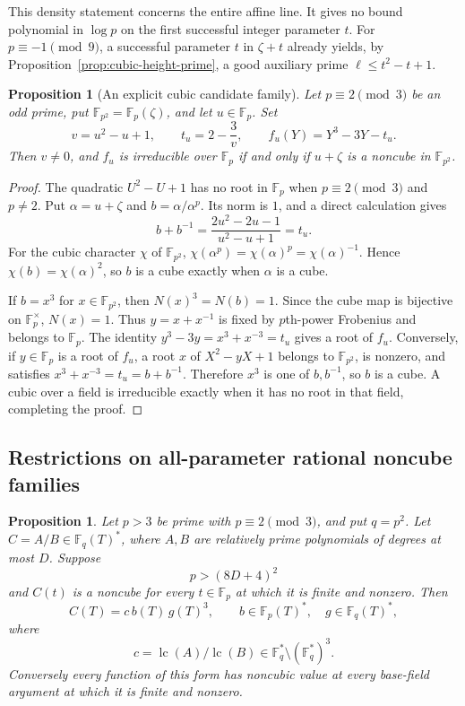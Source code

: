 \documentclass[11pt]{article}
\newtheorem{proposition}[theorem]{Proposition}
\theoremstyle{definition}
\theoremstyle{remark}
\begin{document}
This density statement concerns the entire affine line.
It gives no bound polynomial in $\log p$ on the first successful
integer parameter $t$. For $p\equiv-1\pmod9$, a successful parameter
$t$ in $\zeta+t$ already yields, by
Proposition~\ref{prop:cubic-height-prime}, a good auxiliary prime
$\ell\le t^2-t+1$.

\begin{proposition}[An explicit cubic candidate family]
\label{prop:cubic-torus-family}
Let $p\equiv2\pmod3$ be an odd prime, put
$\mathbb F_{p^2}=\mathbb F_p(\zeta)$, and let $u\in\mathbb F_p$.
Set
\[
 v=u^2-u+1,\qquad
 t_u=2-\frac3v,\qquad
 f_u(Y)=Y^3-3Y-t_u .
\]
Then $v\ne0$, and $f_u$ is irreducible over $\mathbb F_p$
if and only if $u+\zeta$ is a noncube in $\mathbb F_{p^2}$.
\end{proposition}

\begin{proof}
The quadratic $U^2-U+1$ has no root in $\mathbb F_p$ when
$p\equiv2\pmod3$ and $p\ne2$.
Put $\alpha=u+\zeta$ and
$b=\alpha/\alpha^p$. Its norm is $1$, and a direct calculation gives
\[
 b+b^{-1}=
 \frac{2u^2-2u-1}{u^2-u+1}=t_u .
\]
For the cubic character $\chi$ of $\mathbb F_{p^2}$,
$\chi(\alpha^p)=\chi(\alpha)^p=\chi(\alpha)^{-1}$.
Hence $\chi(b)=\chi(\alpha)^2$, so $b$ is a cube exactly when
$\alpha$ is a cube.

If $b=x^3$ for $x\in\mathbb F_{p^2}$, then
$N(x)^3=N(b)=1$. Since the cube map is bijective on
$\mathbb F_p^\times$, $N(x)=1$.
Thus $y=x+x^{-1}$ is fixed by $p$th-power Frobenius and belongs
to $\mathbb F_p$. The identity
$y^3-3y=x^3+x^{-3}=t_u$ gives a root of $f_u$.
Conversely, if $y\in\mathbb F_p$ is a root of $f_u$, a root $x$
of $X^2-yX+1$ belongs to $\mathbb F_{p^2}$, is nonzero, and
satisfies $x^3+x^{-3}=t_u=b+b^{-1}$.
Therefore $x^3$ is one of $b,b^{-1}$, so $b$ is a cube.
A cubic over a field is irreducible exactly when it has no root
in that field, completing the proof.
\end{proof}



\subsection{Restrictions on all-parameter rational noncube families}

\begin{proposition}\label{prop:rational-noncube-family}
Let $p>3$ be prime with $p\equiv2\pmod3$, and put $q=p^2$.
Let $C=A/B\in\mathbb F_q(T)^*$, where $A,B$ are relatively
prime polynomials of degrees at most $D$.  Suppose
\[
 p>(8D+4)^2
\]
and $C(t)$ is a noncube for every $t\in\mathbb F_p$ at which it
is finite and nonzero.  Then
\[
 C(T)=c\,b(T)\,g(T)^3,
 \qquad b\in\mathbb F_p(T)^*,\quad
 g\in\mathbb F_q(T)^*,
\]
where
\[
 c=\operatorname{lc}(A)/\operatorname{lc}(B)
       \in\mathbb F_q^*\setminus(\mathbb F_q^*)^3.
\]
Conversely every function of this form has noncubic value at every
base-field argument at which it is finite and nonzero.
\end{proposition}
\end{document}
